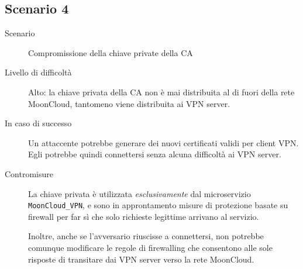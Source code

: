 \subsection{Scenario 4}
\begin{description}
    \item[Scenario]Compromissione della chiave private della CA
    \item[Livello di difficoltà]Alto: la chiave privata della CA 
    non è mai distribuita al di fuori della rete MoonCloud, tantomeno
    viene distribuita ai VPN server.
    \item[In caso di successo]Un attaccente potrebbe generare dei nuovi
    certificati validi per client VPN. Egli potrebbe quindi connettersi
    senza alcuna difficoltà ai VPN server.
    \item[Contromisure]La chiave privata è utilizzata \textit{esclusivamente}
    dal microservizio \texttt{MoonCloud\_VPN}, e sono in approntamento
    misure di protezione basate su firewall per far sì che
    solo richieste legittime arrivano al servizio.

    Inoltre, anche se l'avversario riuscisse a connettersi, non potrebbe
    comunque modificare le regole di firewalling che consentono
    alle sole risposte di transitare dai VPN server verso la rete MoonCloud.
\end{description}